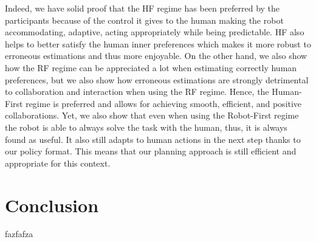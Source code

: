Indeed, we have solid proof that the HF regime has been preferred by the participants because of the control it gives to the human making the robot accommodating, adaptive, acting appropriately while being predictable. HF also helps to better satisfy the human inner preferences which makes it more robust to erroneous estimations and thus more enjoyable. 
On the other hand, we also show how the RF regime can be appreciated a lot when estimating correctly human preferences, but we also show how erroneous estimations are strongly detrimental to collaboration and interaction when using the RF regime. 
Hence, the Human-First regime is preferred and allows for achieving smooth, efficient, and positive collaborations.
Yet, we also show that even when using the Robot-First regime the robot is able to always solve the task with the human, thus, it is always found as useful. It also still adapts to human actions in the next step thanks to our policy format. This means that our planning approach is still efficient and appropriate for this context. 

\section{Conclusion}

fazfafza